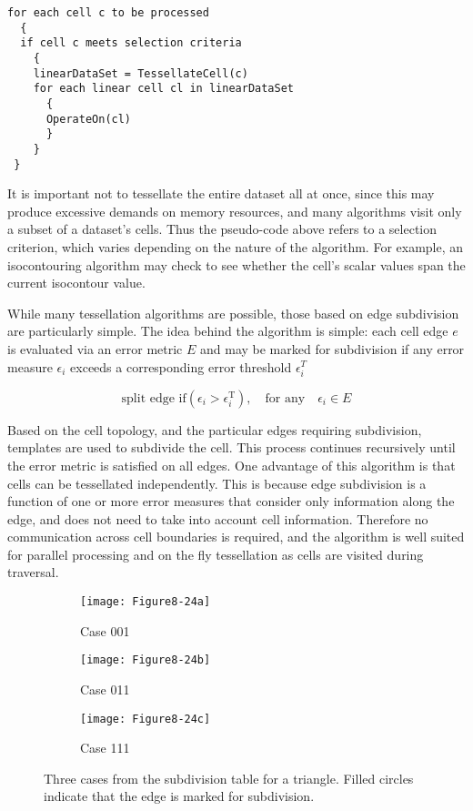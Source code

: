 \begin{lstlisting}[caption={}, numbers=none, frame=none]
for each cell c to be processed
  {
  if cell c meets selection criteria
    {
    linearDataSet = TessellateCell(c)
    for each linear cell cl in linearDataSet
      {
      OperateOn(cl)
      }
    }
 }
\end{lstlisting}

It is important not to tessellate the entire dataset all at once, since this may produce excessive demands on memory resources, and many algorithms visit only a subset of a dataset's cells. Thus the pseudo-code above refers to a selection criterion, which varies depending on the nature of the algorithm. For example, an isocontouring algorithm may check to see whether the cell's scalar values span the current isocontour value.

While many tessellation algorithms are possible, those based on edge subdivision are particularly simple. The idea behind the algorithm is simple: each cell edge $e$ is evaluated via an error metric $E$ and may be marked for subdivision if any error measure $\epsilon_i$ exceeds a corresponding error threshold $\epsilon_i^T$  

\begin{equation}\label{eq:8.7}
\text{split edge if} (\epsilon_i > \epsilon_i^{\text{T}}), \quad \text{for any} \quad \epsilon_i \in E
\end{equation}

Based on the cell topology, and the particular edges requiring subdivision, templates are used to subdivide the cell. This process continues recursively until the error metric is satisfied on all edges. One advantage of this algorithm is that cells can be tessellated independently. This is because edge subdivision is a function of one or more error measures that consider only information along the edge, and does not need to take into account cell information. Therefore no communication across cell boundaries is required, and the algorithm is well suited for parallel processing and on the fly tessellation as cells are visited during traversal.

\begin{figure}[!htb]
    \centering
    \begin{subfigure}{0.32\linewidth}
        \centering
        \texttt{[image: Figure8-24a]}
        \caption{Case 001}\label{fig:Figure8-24a}
    \end{subfigure}
    \hfill
    \begin{subfigure}{0.32\linewidth}
        \centering
        \texttt{[image: Figure8-24b]}
        \caption{Case 011}\label{fig:Figure8-24b}
    \end{subfigure}%
    \hfill
    \begin{subfigure}{0.32\linewidth}
        \centering
        \texttt{[image: Figure8-24c]}
        \caption{Case 111}\label{fig:Figure8-24c}
    \end{subfigure}%
    \caption{Three cases from the subdivision table for a triangle. Filled circles indicate that the edge is marked for subdivision.}
    \label{fig:Figure8-24}
\end{figure}

